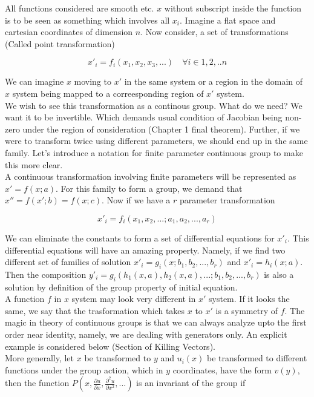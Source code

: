 \documentclass{report}
\begin{document}
All functions considered are smooth etc. $x$ without subscript inside the function is to be seen as something which involves all $x_i$. Imagine a flat space and cartesian coordinates of dimension $n$. Now consider, a set of transformations (Called point transformation)

$$x'_i = f_i(x_1, x_2, x_3, ...) \quad \forall i \in {1,2,..n}$$

\noindent We can imagine $x$ moving to $x'$ in the same system or a region in the domain of $x$ system being mapped to a correesponding region of $x'$ system.\\

\noindent We wish to see this transformation as a continous group. What do we need? We want it to be invertible. Which demands usual condition of Jacobian being non-zero under the region of consideration (Chapter 1 final theorem). Further, if we were to transform twice using different parameters, we should end up in the same family. Let's introduce a notation for finite parameter continuous group to make this more clear. \\

\noindent A continuous transformation involving finite parameters will be represented as $x' = f(x;a)$. For this family to form a group, we demand that $x'' = f(x'; b) = f(x;c)$. Now if we have a $r$ parameter transformation 

$$x'_i = f_i(x_1,x_2,...; a_1,a_2,...,a_r)$$

\noindent We can eliminate the constants to form a set of differential equations for $x'_i$. This differential equations will have an amazing property. Namely, if we find two different set of families of solution $x'_i = g_i(x;b_1,b_2,...,b_r)$ and $x'_i = h_i(x;a)$. Then the composition $y'_i = g_i(h_1(x,a), h_2(x,a),...;b_1,b_2,...,b_r)$ is also a solution by definition of the group property of initial equation.\\

\noindent A function $f$ in $x$ system may look very different in $x'$ system. If it looks the same, we say that the trasformation which takes $x$ to $x'$ is a symmetry of $f$. The magic in theory of continuous groups is that we can always analyze upto the first order near identity, namely, we are dealing with generators only. An explicit example is considered below (Section of Killing Vectors).\\

\noindent More generally, let $x$ be transformed to $y$ and $u_i(x)$ be transformed to different functions under the group action, which in $y$ coordinates, have the form $v(y)$, then the function $P(x,\frac{\partial u}{\partial x}, \frac{\partial ^2 u}{\partial x^2},...)$ is an invariant of the group if 
\end{document}
